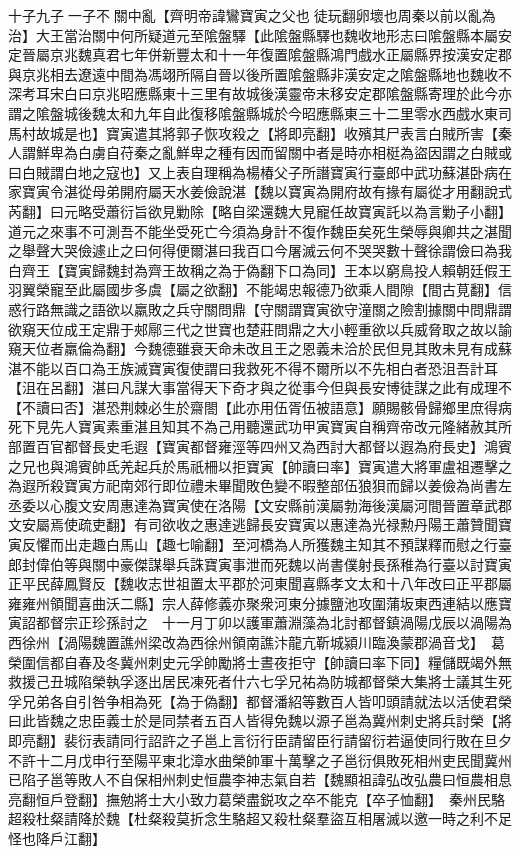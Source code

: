 十子九子一子不關中亂【齊明帝諱鸞寶寅之父也徒玩翻卵壞也周秦以前以亂為治】大王當治關中何所疑道元至隂盤驛【此隂盤縣驛也魏收地形志曰隂盤縣本屬安定晉屬京兆魏真君七年併新豐太和十一年復置隂盤縣鴻門戲水正屬縣界按漢安定郡與京兆相去遼遠中間為馮翊所隔自晉以後所置隂盤縣非漢安定之隂盤縣地也魏收不深考耳宋白曰京兆昭應縣東十三里有故城後漢靈帝末移安定郡隂盤縣寄理於此今亦謂之隂盤城後魏太和九年自此復移隂盤縣城於今昭應縣東三十二里零水西戲水東司馬村故城是也】寶寅遣其將郭子恢攻殺之【將即亮翻】收殯其尸表言白賊所害【秦人謂鮮卑為白虜自苻秦之亂鮮卑之種有因而留關中者是時亦相梃為盜因謂之白賊或曰白賊謂白地之寇也】又上表自理稱為楊椿父子所譖寶寅行臺郎中武功蘇湛卧病在家寶寅令湛從母弟開府屬天水姜儉說湛【魏以寶寅為開府故有掾有屬從才用翻說式芮翻】曰元略受蕭衍旨欲見勦除【略自梁還魏大見寵任故寶寅託以為言勦子小翻】道元之來事不可測吾不能坐受死亡今須為身計不復作魏臣矣死生榮辱與卿共之湛聞之舉聲大哭儉遽止之曰何得便爾湛曰我百口今屠滅云何不哭哭數十聲徐謂儉曰為我白齊王【寶寅歸魏封為齊王故稱之為于偽翻下口為同】王本以窮鳥投人賴朝廷假王羽翼榮寵至此屬國步多虞【屬之欲翻】不能竭忠報德乃欲乘人間隙【間古莧翻】信惑行路無識之語欲以羸敗之兵守關問鼎【守關謂寶寅欲守潼關之險割據關中問鼎謂欲窺天位成王定鼎于郟鄏三代之世寶也楚莊問鼎之大小輕重欲以兵威脅取之故以諭窺天位者羸倫為翻】今魏德雖衰天命未改且王之恩義未洽於民但見其敗未見有成蘇湛不能以百口為王族滅寶寅復使謂曰我救死不得不爾所以不先相白者恐沮吾計耳【沮在呂翻】湛曰凡謀大事當得天下奇才與之從事今但與長安博徒謀之此有成理不【不讀曰否】湛恐荆棘必生於齋閤【此亦用伍胥伍被語意】願賜骸骨歸鄉里庶得病死下見先人寶寅素重湛且知其不為己用聽還武功甲寅寶寅自稱齊帝改元隆緒赦其所部置百官都督長史毛遐【寶寅都督雍涇等四州又為西討大都督以遐為府長史】鴻賓之兄也與鴻賓帥氐羌起兵於馬祇柵以拒寶寅【帥讀曰率】寶寅遣大將軍盧祖遷擊之為遐所殺寶寅方祀南郊行即位禮未畢聞敗色變不暇整部伍狼狽而歸以姜儉為尚書左丞委以心腹文安周惠達為寶寅使在洛陽【文安縣前漢屬勃海後漢屬河間晉置章武郡文安屬焉使疏吏翻】有司欲收之惠達逃歸長安寶寅以惠達為光禄勲丹陽王蕭贊聞寶寅反懼而出走趣白馬山【趣七喻翻】至河橋為人所獲魏主知其不預謀釋而慰之行臺郎封偉伯等與關中豪傑謀舉兵誅寶寅事泄而死魏以尚書僕射長孫稚為行臺以討寶寅正平民薛鳳賢反【魏收志世祖置太平郡於河東聞喜縣孝文太和十八年改曰正平郡屬雍雍州領聞喜曲沃二縣】宗人薛修義亦聚衆河東分據鹽池攻圍蒲坂東西連結以應寶寅詔都督宗正珍孫討之　十一月丁卯以護軍蕭淵藻為北討都督鎮渦陽戊辰以渦陽為西徐州【渦陽魏置譙州梁改為西徐州領南譙汴龍亢靳城潁川臨渙蒙郡渦音戈】　葛榮圍信都自春及冬冀州刺史元孚帥勵將士晝夜拒守【帥讀曰率下同】糧儲既竭外無救援己丑城陷榮執孚逐出居民凍死者什六七孚兄祐為防城都督榮大集將士議其生死孚兄弟各自引咎争相為死【為于偽翻】都督潘紹等數百人皆叩頭請就法以活使君榮曰此皆魏之忠臣義士於是同禁者五百人皆得免魏以源子邕為冀州刺史將兵討榮【將即亮翻】裴衍表請同行詔許之子邕上言衍行臣請留臣行請留衍若逼使同行敗在旦夕不許十二月戊申行至陽平東北漳水曲榮帥軍十萬擊之子邕衍俱敗死相州吏民聞冀州已陷子邕等敗人不自保相州刺史恒農李神志氣自若【魏顯祖諱弘改弘農曰恒農相息亮翻恒戶登翻】撫勉將士大小致力葛榮盡鋭攻之卒不能克【卒子恤翻】　秦州民駱超殺杜粲請降於魏【杜粲殺莫折念生駱超又殺杜粲羣盜互相屠滅以邀一時之利不足怪也降戶江翻】

